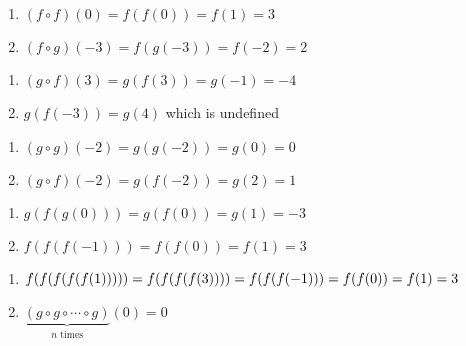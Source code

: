 \begin{multicols}{2}
\begin{enumerate}
\setcounter{enumi}{\value{HW}}

\item $(f \circ f)(0) = f(f(0)) = f(1) = 3$
\item $(f \circ g)(-3) = f(g(-3)) = f(-2) = 2$

\setcounter{HW}{\value{enumi}}
\end{enumerate}
\end{multicols}

\begin{multicols}{2}
\begin{enumerate}
\setcounter{enumi}{\value{HW}}

\item $(g \circ f)(3) = g(f(3)) = g(-1) = -4$
\item $g(f(-3)) = g(4)$ which is undefined

\setcounter{HW}{\value{enumi}}
\end{enumerate}
\end{multicols}

\begin{multicols}{2}
\begin{enumerate}
\setcounter{enumi}{\value{HW}}

\item $(g \circ g)(-2) = g(g(-2)) = g(0) = 0$
\item $(g \circ f)(-2) = g(f(-2)) = g(2) = 1$

\setcounter{HW}{\value{enumi}}
\end{enumerate}
\end{multicols}

\begin{multicols}{2}
\begin{enumerate}
\setcounter{enumi}{\value{HW}}

\item $g(f(g(0))) = g(f(0)) = g(1) = -3$
\item $f(f(f(-1))) = f(f(0)) = f(1) = 3$

\setcounter{HW}{\value{enumi}}
\end{enumerate}
\end{multicols}

\begin{multicols}{2}
\begin{enumerate}
\setcounter{enumi}{\value{HW}}

\item $f(f(f(f(f(1))))) = f(f(f(f(3)))) =\\ f(f(f(-1))) = f(f(0))  = f(1) = 3$
\item $\underbrace{(g \circ g \circ \cdots \circ g)}_{\mbox{$n$ times}}(0) = 0$

\setcounter{HW}{\value{enumi}}
\end{enumerate}
\end{multicols}

